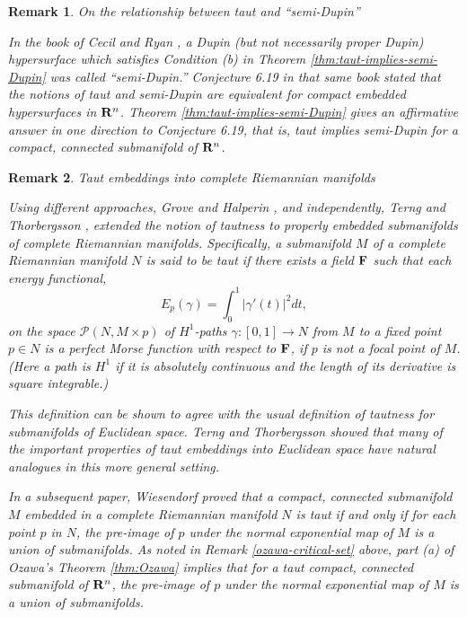 \documentclass[12pt]{article}
\newtheorem{remark}{Remark}[section]
\begin{document}
{\begin{remark}{On the relationship between taut and ``semi-Dupin''}
\label{rem:semi-Dupin}

\noindent
{\rm In the book of Cecil and Ryan \cite[p. 189]{CR7}, a Dupin (but not necessarily proper Dupin) hypersurface 
which satisfies Condition (b) in Theorem \ref{thm:taut-implies-semi-Dupin} was called ``semi-Dupin.''  Conjecture 6.19 \cite[p. 190]{CR7}
 in that same book stated that the notions of taut and semi-Dupin are equivalent for compact embedded
 hypersurfaces in ${\bf R}^n$.
Theorem \ref{thm:taut-implies-semi-Dupin}
gives an affirmative answer in one direction to Conjecture 6.19, that is, taut implies semi-Dupin for a compact, connected submanifold of ${\bf R}^n$.}
\end{remark}


\begin{remark}{Taut embeddings into complete Riemannian manifolds}
\label{rem:TTW}

\noindent
{\rm Using different approaches, Grove and Halperin \cite{GH-91}, and independently, Terng and Thorbergsson 
\cite{TTh1}, extended the notion of tautness to properly embedded
submanifolds of complete Riemannian manifolds.  
Specifically, a submanifold $M$ of a complete Riemannian manifold $N$ is said to be taut if there exists a field ${\bf F}$ such that each energy functional,
\begin{equation}
\label{eq:energy}
E_p (\gamma) = \int_{0}^{1} |\gamma'(t)|^2 dt,
\end{equation}
on the space $\mathcal P (N,M \times p)$ of $H^1$-paths $\gamma :[0,1] \rightarrow N$ from $M$ to a fixed point $p \in N$ is a perfect Morse function with respect to ${\bf F}$, if $p$ is not a
focal point of $M$. (Here a path is $H^1$ if it is absolutely continuous and the length of its derivative is square integrable.)


This definition can be shown to agree with the usual definition of tautness for submanifolds of Euclidean space.
Terng and Thorbergsson \cite{TTh1} showed that many of the important properties of taut embeddings
into Euclidean space have natural analogues in this more general setting. 

In a subsequent paper, Wiesendorf \cite{Wiesendorf} 
proved that a compact, connected submanifold $M$ embedded in a complete Riemannian manifold $N$ is taut if and only if for each point $p$ in $N$, the pre-image of $p$ under the normal exponential
map  of $M$ is a union of submanifolds.  As noted in Remark \ref{ozawa-critical-set} above,
part (a) of Ozawa's Theorem \ref{thm:Ozawa} implies that
for a taut compact, connected submanifold of ${\bf R}^n$,
the pre-image of $p$ under the normal exponential
map  of $M$ is a union of submanifolds. 

}
\end{remark}}
\end{document}
